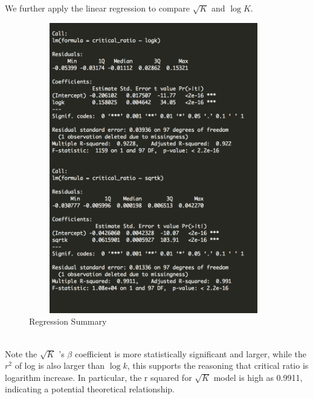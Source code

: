 \documentclass[10pt,english]{article}\usepackage{graphicx, color}
\numberwithin{equation}{section}
\numberwithin{figure}{section}
\begin{document}
\quad\\
\quad\\
We further apply the linear regression to compare $\sqrt{K}$ and $\log{K}$.\\
\begin{figure}[htbp]
\centering\includegraphics[width=4.3in, height=5in]{reg}
\caption{Regression Summary}
\end{figure}
\quad\\
Note the $\sqrt{K}$ 's $\beta$ coefficient is more statistically significant and larger, while the $r^2$ of log is also larger than $\log{k}$, this supports the reasoning that critical ratio is logarithm increase. In particular, the r squared for  $\sqrt{K}$ model is high as 0.9911, indicating a potential theoretical relationship.
\end{document}
